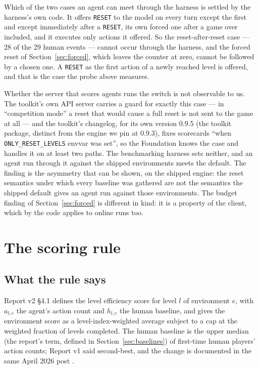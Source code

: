 \documentclass[11pt]{article}
\newcommand{\code}[1]{\texttt{#1}}
\begin{document}
Which of the two cases an agent can meet through the harness is settled by
the harness's own code. It offers \code{RESET} to the model on every turn
except the first and except immediately after a \code{RESET}, its own forced
one after a game over included, and it executes only actions it offered. So
the reset-after-reset case --- 28 of the 29 human events --- cannot occur
through the harness, and the forced reset of Section~\ref{sec:forced}, which leaves
the counter at zero, cannot be followed by a chosen one. A \code{RESET} as
the first action of a newly reached level is offered, and that is the case
the probe above measures.

Whether the server that scores agents runs the switch is not observable to
us. The toolkit's own API server carries a guard for exactly this case --- in
``competition mode'' a reset that would cause a full reset is not sent to the
game at all --- and the toolkit's changelog, for its own version 0.9.5 (the
toolkit package, distinct from the engine we pin at 0.9.3), fixes scorecards ``when
\code{ONLY\_RESET\_LEVELS} envvar was set'', so the Foundation knows the case
and handles it on at least two paths. The benchmarking harness sets neither,
and an agent run through it against the shipped environments meets the
default. The finding is the asymmetry that can be shown, on the shipped
engine: the reset semantics under which every baseline was gathered are not
the semantics the shipped default gives an agent run against those
environments. The budget finding of Section~\ref{sec:forced} is different in kind:
it is a property of the client, which by the code applies to online runs too.

\section{The scoring rule}
\label{sec:scoring}

\subsection{What the rule says}

Report v2 \S4.1 defines the level efficiency score for level $l$ of environment
$e$, with $a_{l,e}$ the agent's action count and $h_{l,e}$ the human baseline,
and gives the environment score as a level-index-weighted average subject to a
cap at the weighted fraction of levels completed. The human baseline is the
upper median (the report's term, defined in Section~\ref{sec:baselines}) of
first-time human players' action counts; Report v1 said
second-best, and the change is documented in the same April 2026 post
\cite{humandataset}.
\end{document}
